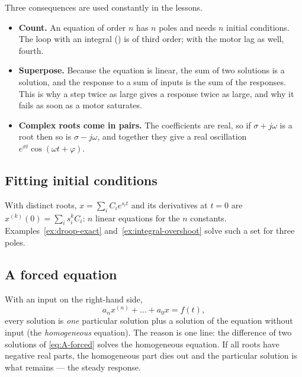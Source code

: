 Three consequences are used constantly in the lessons.
\begin{itemize}
  \item \textbf{Count.} An equation of order $n$ has $n$ poles and needs $n$ initial conditions. The loop with an integral () is of third order; with the motor lag as well, fourth.
  \item \textbf{Superpose.} Because the equation is linear, the sum of two solutions is a solution, and the response to a sum of inputs is the sum of the responses. This is why a step twice as large gives a response twice as large, and why it fails as soon as a motor saturates.
  \item \textbf{Complex roots come in pairs.} The coefficients are real, so if $\sigma + j\omega$ is a root then so is $\sigma - j\omega$, and together they give a real oscillation $e^{\sigma t}\cos(\omega t + \varphi)$.
\end{itemize}

\subsection{Fitting initial conditions}
With distinct roots, $x = \sum_i C_i e^{s_i t}$ and its derivatives at $t = 0$ are $x^{(k)}(0) = \sum_i s_i^k C_i$: $n$ linear equations for the $n$ constants. Examples~\ref{ex:droop-exact} and~\ref{ex:integral-overshoot} solve such a set for three poles.

\subsection{A forced equation}
With an input on the right-hand side,
\begin{equation}\label{eq:A-forced}
  a_n x^{(n)} + \dots + a_0 x = f(t),
\end{equation}
every solution is \emph{one} particular solution plus a solution of the equation without input (the \emph{homogeneous} equation). The reason is one line: the difference of two solutions of \cref{eq:A-forced} solves the homogeneous equation. If all roots have negative real parts, the homogeneous part dies out and the particular solution is what remains — the steady response.

